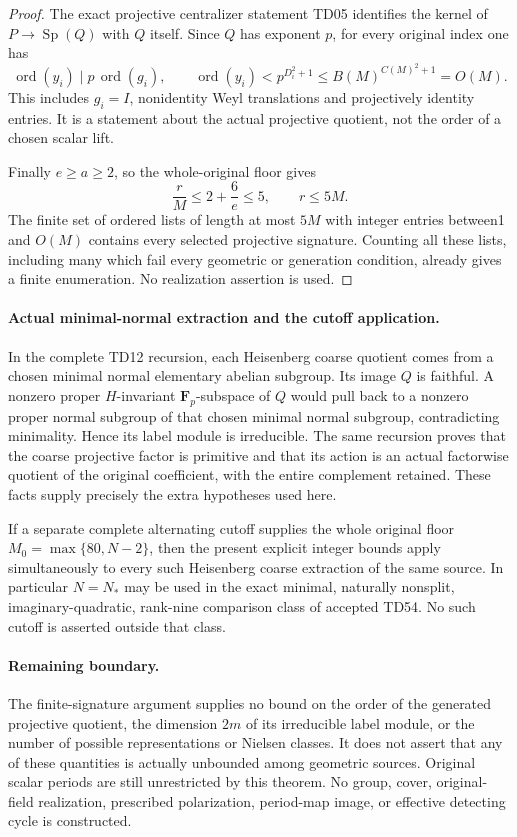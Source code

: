 \begin{proof}
The exact projective centralizer statement TD05 identifies the
kernel of \(P\to\operatorname{Sp}(Q)\) with \(Q\) itself.
Since \(Q\) has exponent \(p\), for every original index one has
\[
 \operatorname{ord}(y_i)\mid p\,\operatorname{ord}(g_i),
 \qquad
 \operatorname{ord}(y_i)
       <p^{D_i^2+1}\le B(M)^{C(M)^2+1}=O(M).
 \tag{HFS.16}
\]
This includes \(g_i=I\), nonidentity Weyl translations and
projectively identity entries.  It is a statement about the
actual projective quotient, not the order of a chosen scalar lift.

Finally \(e\ge a\ge2\), so the whole-original floor gives
\[
             \frac rM\le2+\frac6e\le5,
                         \qquad r\le5M.
 \tag{HFS.17}
\]
The finite set of ordered lists of length at most \(5M\)
with integer entries between1 and \(O(M)\) contains every
selected projective signature.  Counting all these lists, including
many which fail every geometric or generation condition, already
gives a finite enumeration.  No realization assertion is used.
\end{proof}

\paragraph{Actual minimal-normal extraction and the cutoff application.}
In the complete TD12 recursion, each Heisenberg coarse quotient
comes from a chosen minimal normal elementary abelian subgroup.
Its image \(Q\) is faithful.  A nonzero proper \(H\)-invariant
\(\mathbf F_p\)-subspace of \(Q\) would pull back to a nonzero
proper normal subgroup of that chosen minimal normal subgroup,
contradicting minimality.  Hence its label module is irreducible.
The same recursion proves that the coarse projective factor is
primitive and that its action is an actual factorwise quotient
of the original coefficient, with the entire complement retained.
These facts supply precisely the extra hypotheses used here.

If a separate complete alternating cutoff supplies the whole
original floor \(M_0=\max\{80,N-2\}\), then the present explicit
integer bounds apply simultaneously to every such Heisenberg
coarse extraction of the same source.  In particular \(N=N_*\)
may be used in the exact minimal, naturally nonsplit,
imaginary-quadratic, rank-nine comparison class of accepted TD54.
No such cutoff is asserted outside that class.

\paragraph{Remaining boundary.}
The finite-signature argument supplies no bound on the order of
the generated projective quotient, the dimension \(2m\) of its
irreducible label module, or the number of possible representations
or Nielsen classes.  It does not assert that any of these quantities
is actually unbounded among geometric sources.
Original scalar periods are still unrestricted by this theorem.
No group, cover, original-field realization, prescribed polarization,
period-map image, or effective detecting cycle is constructed.
